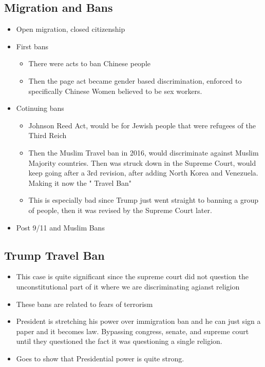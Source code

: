\documentclass{article}
\begin{document}
\subsection{Migration and Bans}
\begin{itemize}
  \item Open migration, closed citizenship
  \item First bans
    \begin{itemize}
      \item There were acts to ban Chinese people
      \item Then the page act became gender based discrimination,
        enforced to specifically Chinese Women believed to be
        sex workers.
    \end{itemize}
  \item Cotinuing bans
    \begin{itemize}
      \item Johnson Reed Act,
        would be for Jewish people that were refugees of the Third Reich
      \item Then the Muslim Travel ban in 2016, would discriminate against
        Muslim Majority countries. Then was struck down in the Supreme Court,
        would keep going after a 3rd revision, after adding North Korea and Venezuela.
        Making it now the " Travel Ban"
      \item This is especially bad since Trump just went straight to banning a group of
        people, then it was revised by the Supreme Court later.
    \end{itemize}
  \item Post 9/11 and Muslim Bans
\end{itemize}

\subsection{Trump Travel Ban}
\begin{itemize}
  \item This case is quite significant since the supreme court did not question
    the unconstitutional part of it where we are discriminating agianst religion
  \item These bans are related to fears of terrorism
  \item President is stretching his power over immigration ban and he can
    just sign a paper and it becomes law. Bypassing congress, senate, and supreme
    court until they questioned the fact it was questioning a single religion.
  \item Goes to show that Presidential power is quite strong.
\end{itemize}
\end{document}
